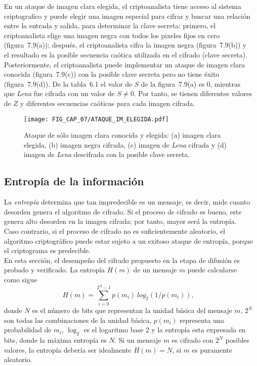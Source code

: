 En un ataque de imagen clara elegida, el criptoanalista tiene acceso al sistema criptografico y puede elegir una imagen especial para cifrar y buscar una relación entre la entrada y salida, para determinar la clave secreta: primero, el criptoanalista elige una imagen negra con todos los pixeles fijos en cero (figura~7.9(a)); después, el criptoanalista cifra la imagen negra (figura~7.9(b)) y el resultado es la posible secuencia caótica utilizada en el cifrado (clave secreta). Posteriormente, el criptoanalista puede implementar un ataque de imagen clara conocida (figura~7.9(c)) con la posible clave secreta pero no tiene éxito (figura~7.9(d)). De la tabla~6.1 el valor de $S$ de la figura~7.9(a) es 0, mientras que \textit{Lena} fue cifrada con un valor de $S\neq 0$. Por tanto, se tienen diferentes valores de $Z$ y diferentes secuencias caóticas para cada imagen cifrada.    

\begin{figure}[!htbp] %
	\center
	\texttt{[image: FIG\_CAP\_07/ATAQUE\_IM\_ELEGIDA.pdf]}     	 
	\caption{Ataque de sólo imagen clara conocida y elegida: (a) imagen clara elegida, (b) imagen negra cifrada, (c) imagen de \textit{Lena} cifrada y (d) imagen de \textit{Lena} descifrada con la posible clave secreta.}
\end{figure}

\subsection{Entropía de la información}
La \textit{entropía} determina que tan impredecible es un mensaje, es decir, mide cuanto desorden genera el algoritmo de cifrado. Si el proceso de cifrado es bueno, este genera alto desorden en la imagen cifrada; por tanto, mayor será la entropía. Caso contrario, si el proceso de cifrado no es suficientemente aleatorio, el algoritmo criptográfico puede estar sujeto a un exitoso ataque de entropía, porque el criptograma es predecible. \\

En esta sección, el desempeño del cifrado propuesto en la etapa de difusión es probado y verificado. La entropía $H(m)$ de un mensaje $m$ puede calcularse como sigue
\begin{equation}
H(m)=\sum_{i=0}^{2^{N}-1}p(m_{i})~log_{2}(1/p(m_{i})),
\end{equation}
donde $N$ es el número de bits que representan la unidad básica del mensaje $m$, $2^{N}$ son todas las combinaciones de la unidad básica, $p(m_{i})$ representa una probabilidad de $m_{i}$, $\log_{2}$ es el logaritmo base 2 y la entropía esta expresada en bits, donde la máxima entropía es $N$. Si un mensaje $m$ es cifrado con $2^{N}$ posibles valores, la entropía debería ser idealmente $H(m)=N$, si $m$ es puramente aleatorio. \\   

